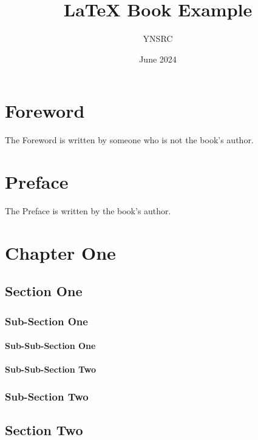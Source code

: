 \documentclass[12pt, twoside]{book}
\title{\LaTeX{} Book Example}
\author{YNSRC}
\date{June 2024}
\begin{document}
\maketitle

\frontmatter %
\chapter*{Foreword}
The Foreword is written by someone who is not the book's author.

\chapter*{Preface}
The Preface is written by the book's author.

\tableofcontents
\listoffigures
\listoftables

\mainmatter

\chapter{Chapter One}

\section{Section One}
\blindtext[2]

\subsection{Sub-Section One}
\blindtext[3]

\subsubsection{Sub-Sub-Section One}
\blindtext[4]

\subsubsection{Sub-Sub-Section Two}
\blindtext[2]

\subsection{Sub-Section Two}
\blindtext[2]

\section{Section Two}
\blindtext[3]
\end{document}
